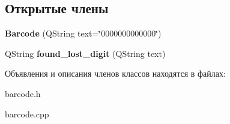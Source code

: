 \subsection*{Открытые члены}
\begin{DoxyCompactItemize}
\item 
\hypertarget{class_barcode_aa9a0ac532bef74f09fa68f40a7b0f2bc}{{\bfseries \-Barcode} (\-Q\-String text=\char`\"{}0000000000000\char`\"{})}\label{class_barcode_aa9a0ac532bef74f09fa68f40a7b0f2bc}

\item 
\hypertarget{class_barcode_a31c5a3e82d93c9abf5faaa117d2c4845}{\-Q\-String {\bfseries found\-\_\-lost\-\_\-digit} (\-Q\-String text)}\label{class_barcode_a31c5a3e82d93c9abf5faaa117d2c4845}

\end{DoxyCompactItemize}


Объявления и описания членов классов находятся в файлах\-:\begin{DoxyCompactItemize}
\item 
barcode.\-h\item 
barcode.\-cpp\end{DoxyCompactItemize}
